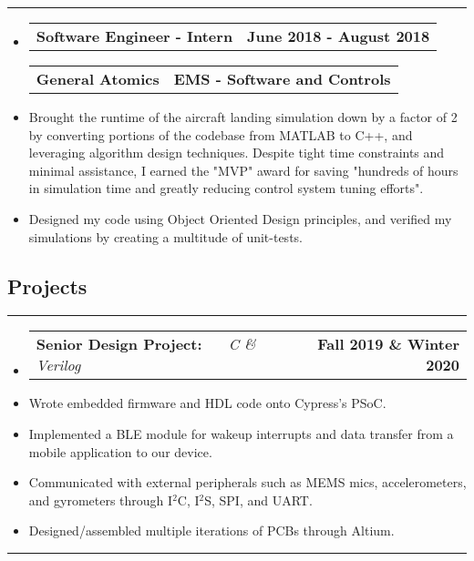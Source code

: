 \documentclass[10pt,letterpaper]{article}
\makeatletter
\newcommand{\header}[2]
{
	\begin{tabular*}{\linewidth}{l @{\extracolsep{\fill}} r}
		\hspace{-27pt} #1 & #2 \\
	\end{tabular*}
}
\newcommand{\sectionbreak}
{
	\vspace{-1.2em}
	\rule{\textwidth}{1.7pt}
	\vspace{-1.7em}
}
\makeatother
\begin{document}
\hrule

\begin{itemize}
	\item[]
		\header
			{\textbf{Software Engineer - Intern}} 
			{\textbf{June 2018 - August 2018}}
		\header
			{\textbf{General Atomics}}
			{\textbf{EMS - Software and Controls}} 
		\item
			Brought the runtime of the aircraft landing simulation down by a factor of 2 by converting portions of the codebase
			from MATLAB to C++, and leveraging algorithm design techniques. Despite tight time constraints and minimal assistance,
			I earned the "MVP" award for saving "hundreds of hours in simulation time and greatly reducing control system tuning efforts".
		\item
			Designed my code using Object Oriented Design principles, and verified my simulations by creating a multitude of unit-tests.



\end{itemize}

\vspace{-1.5em}

\subsection*{Projects}
\sectionbreak


\begin{itemize}
	\item[]
		\header
		{
			\textbf{Senior Design Project: }
			\emph{\smash{Smart Dog Collar}} \ \ \ \footnotesize \emph{C \& Verilog}
		}
			{\textbf{Fall 2019 \& Winter 2020}}
		\item 
			Wrote embedded firmware and HDL code onto Cypress's PSoC. 
		\item 
			Implemented a BLE module for wakeup interrupts and data transfer from a mobile application to our device. 
		\item 
			Communicated with external peripherals such as MEMS mics, accelerometers, and gyrometers through I$^{2}$C, I$^{2}$S, SPI, and UART. 
		\item 
			Designed/assembled multiple iterations of PCBs through Altium.

\end{itemize}

\hrule
\end{document}
